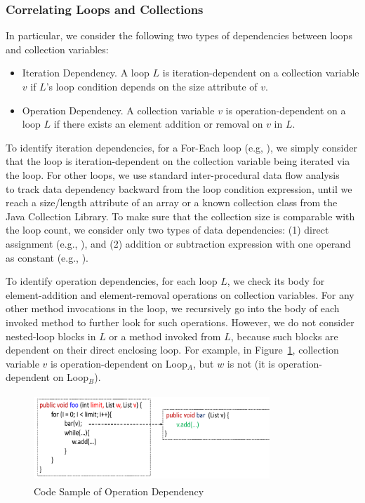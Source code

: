 \subsubsection{Correlating Loops and Collections} In particular, we consider the following two types of dependencies between loops and collection variables:

\begin{itemize}
	\item Iteration Dependency. A loop $L$ is iteration-dependent on a collection variable $v$ if $L$'s loop condition depends on the size attribute of $v$.
	\item Operation Dependency. A collection variable $v$ is operation-dependent on a loop $L$ if there exists an element addition or removal on $v$ in $L$.
	\vspace{-0.15cm}
\end{itemize}

To identify iteration dependencies, for a For-Each loop (e.g, ), we simply consider that the loop is iteration-dependent on the collection variable being iterated via the loop. For other loops, we use standard inter-procedural data flow analysis~\cite{SootIFDS}~\cite{IFDS} to track data dependency backward from the loop condition expression, until we reach a size/length attribute of an array or a known collection class from the Java Collection Library. To make sure that the collection size is comparable with the loop count, we consider only two types of data dependencies: (1) direct assignment (e.g., ), and (2) addition or subtraction expression with one operand as constant (e.g., ). 

To identify operation dependencies, for each loop $L$, we check its body for element-addition and element-removal operations on collection variables. For any other method invocations in the loop, we recursively go into the body of each invoked method to further look for such operations. However, we do not consider nested-loop blocks in $L$ or a method invoked from $L$, because such blocks are dependent on their direct enclosing loop. For example, in Figure~\ref{fig:operationDepend}, collection variable $v$ is operation-dependent on Loop$_A$, but $w$ is not (it is operation-dependent on Loop$_B$). 

\begin{figure}
\centering
	\includegraphics[width=3.5in, height=1.3in]{performance/images/operationDepend.pdf}
	
	\caption{Code Sample of Operation Dependency}	
		
	\label{fig:operationDepend}
\end{figure}




